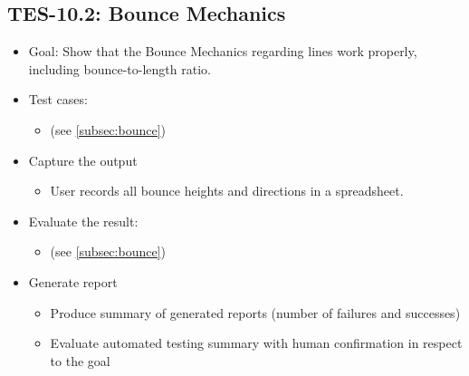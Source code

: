 \subsection{TES-10.2: Bounce Mechanics}
\begin{itemize}
\item Goal: Show that the Bounce Mechanics regarding lines work properly, including bounce-to-length ratio. 

\item Test cases: 
\begin{itemize}
\item (see \ref{subsec:bounce})
\end{itemize}

\item Capture the output
\begin{itemize}
\item User records all bounce heights and directions in a spreadsheet.
\end{itemize}

\item Evaluate the result: 
\begin{itemize}
\item (see \ref{subsec:bounce})
\end{itemize}

\item Generate report 
\begin{itemize}
\item Produce summary of generated reports (number of failures and successes)
\item Evaluate automated testing summary with human confirmation in respect to the goal
\end{itemize}
\end{itemize}

